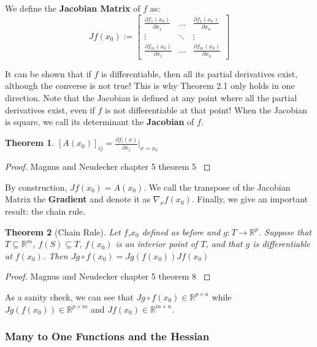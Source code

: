 \documentclass[]{article}
\theoremstyle{mattstyle}
\newtheorem{theorem}{Theorem}[section]
\theoremstyle{definition}
\begin{document}
We define the \textbf{Jacobian Matrix} of $f$ as:
$$ Jf(x_0) :=  \begin{bmatrix}
\frac{\partial f_1(x_0)}{\partial x_1} & \dots  & \frac{\partial f_1(x_0)}{\partial x_n} \\
\vdots & \ddots & \vdots \\
\frac{\partial f_m(x_0)}{\partial x_1} & \dots  & \frac{\partial f_m(x_0)}{\partial x_n}
\end{bmatrix}$$

It can be shown that if $f$ is differentiable, then all its partial derivatives exist, although the converse is not true! This is why Theorem 2.1 only holds in one direction. Note that the Jacobian is defined at any point where all the partial derivatives exist, even if $f$ is not differentiable at that point! When the Jacobian is square, we call its determinant the \textbf{Jacobian} of $f$.

\begin{theorem}
	$[A(x_0)]_{ij} = \frac{\partial f_i(x)}{\partial x_j}\Bigr\rvert_{x=x_{0}}$
\end{theorem} 
\begin{proof}
	Magnus and Neudecker chapter 5 theorem 5 \cite{magnus1988matrix}
\end{proof}

By construction, $Jf(x_0) = A(x_0)$. We call the transpose of the Jacobian Matrix the \textbf{Gradient} and denote it as $\nabla_x f(x_0)$. Finally, we give an important result: the chain rule.
\begin{theorem}[Chain Rule]
	Let $f$,$x_0$ defined as before and $g: T \rightarrow \mathbb{R}^p$. Suppose that $T \subseteq \mathbb{R}^m$, $f(S) \subseteq T$, $f(x_0)$ is an interior point of $T$, and that $g$ is differentiable at $f(x_0)$. Then $Jg \circ f(x_0) = Jg(f(x_0))Jf(x_0)$
\end{theorem} 
\begin{proof}
	Magnus and Neudecker chapter 5 theorem 8 \cite{magnus1988matrix}
\end{proof}

As a sanity check, we can see that $Jg \circ f(x_0) \in \mathbb{R}^{p \times n}$ while  $Jg(f(x_0))\in \mathbb{R}^{p \times m}$ and $Jf(x_0)\in \mathbb{R}^{m\times n}$.

\subsubsection{Many to One Functions and the Hessian}
\end{document}
